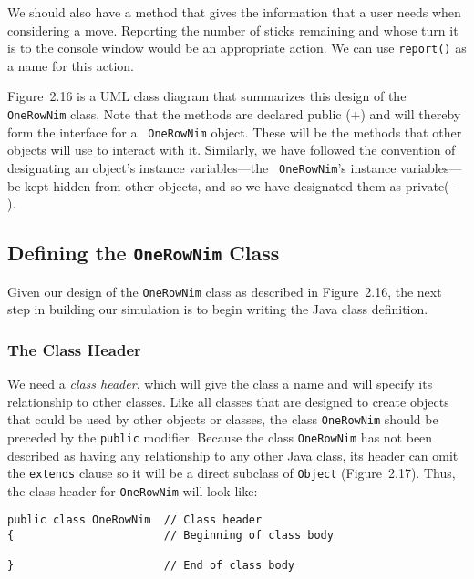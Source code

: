We should also have a method that gives the information that a user
needs when considering a move. Reporting the number of sticks
remaining and whose turn it is to the console window would be an
appropriate action.  We can use {\tt report()} as a name for this
action.

Figure~2.16 is a UML class diagram that summarizes this
design of the {\tt OneRowNim} class.  Note that the methods are
declared public ($+$) and will thereby form the interface for a {\tt
OneRowNim} object. These will be the methods that other objects will
use to interact with it.  Similarly, we have followed the convention
of designating an object's instance variables---the \mbox{\tt
OneRowNim}'s instance variables---be kept hidden from other objects,
and so we have designated them as private($-$).

\subsection{Defining the {\tt OneRowNim} Class}

\noindent Given our design of the {\tt OneRowNim} class
as described in Figure~2.16, the next step in building our
simulation is to begin writing the Java class definition.

\subsubsection*{The Class Header}

\noindent We need a {\it class header}, which will give the class a name
and will specify its relationship to other classes.  Like all classes
that are designed to create objects that could be used by other
objects or classes, the class {\tt OneRowNim} should be preceded by
the {\tt public} modifier.  Because the class {\tt OneRowNim} has not
been described as having any relationship to any other Java class, its
header can omit the {\tt extends} clause so it will be a direct
subclass of {\tt Object} (Figure~2.17).
Thus, the class header for {\tt OneRowNim} will look like:

\begin{jjjlisting}
\begin{lstlisting}
public class OneRowNim  // Class header
{                       // Beginning of class body

}                       // End of class body
\end{lstlisting}
\end{jjjlisting}

